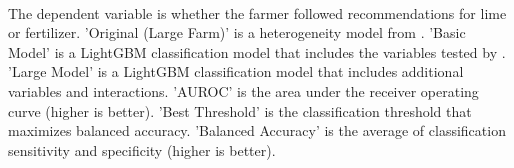 \begin{table}[H] \centering
{}

\caption{Model Results Comparison: Fertilizer}
\\ \parbox{0.79\linewidth}{\tiny The dependent variable is whether the farmer followed recommendations for lime or fertilizer. 'Original (Large Farm)' is a heterogeneity model from \textcite{fabregas_digital_2025}. 'Basic Model' is a LightGBM classification model that includes the variables tested by \textcite{fabregas_digital_2025}. 'Large Model'  is a LightGBM classification model that includes additional variables and interactions. 'AUROC' is the area under the receiver operating curve (higher is better). 'Best Threshold' is the classification threshold that maximizes balanced accuracy. 'Balanced Accuracy' is the average of classification sensitivity and specificity (higher is better).}
\end{table}
